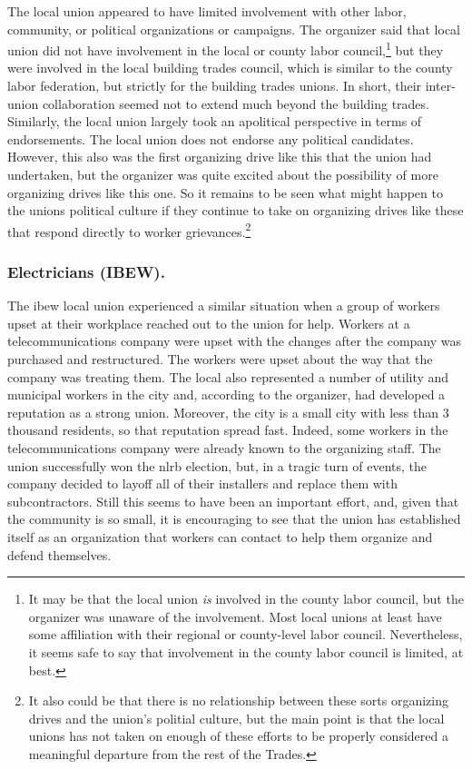 \documentclass[12pt]{article}
\begin{document}
The local union appeared to have limited involvement with other labor, community, or political organizations or campaigns. The organizer said that local union did not have involvement in the local or county labor council,\footnote{It may be that the local union \emph{is} involved in the county labor council, but the organizer was unaware of the involvement. Most local unions at least have some affiliation with their regional or county-level labor council. Nevertheless, it seems safe to say that involvement in the county labor council is limited, at best.} but they were involved in the local building trades council, which is similar to the county labor federation, but strictly for the building trades unions. In short, their inter-union collaboration seemed not to extend much beyond the building trades. Similarly, the local union largely took an apolitical perspective in terms of endorsements. The local union does not endorse any political candidates. However, this also was the first organizing drive like this that the union had undertaken, but the organizer was quite excited about the possibility of more organizing drives like this one. So it remains to be seen what might happen to the unions political culture if they continue to take on organizing drives like these that respond directly to worker grievances.\footnote{It also could be that there is no relationship between these sorts organizing drives and the union's politial culture, but the main point is that the local unions has not taken on enough of these efforts to be properly considered a meaningful departure from the rest of the Trades.}

\subsubsection{Electricians (IBEW).}

The \acrshort{ibew} local union experienced a similar situation when a group of workers upset at their workplace reached out to the union for help. Workers at a telecommunications company were upset with the changes after the company was purchased and restructured. The workers were upset about the way that the company was treating them. The local also represented a number of utility and municipal workers in the city and, according to the organizer, had developed a reputation as a strong union. Moreover, the city is a small city with less than 3 thousand residents, so that reputation spread fast. Indeed, some workers in the telecommunications company were already known to the organizing staff. The union successfully won the \acrshort{nlrb} election, but, in a tragic turn of events, the company decided to layoff all of their installers and replace them with subcontractors. Still this seems to have been an important effort, and, given that the community is so small, it is encouraging to see that the union has established itself as an organization that workers can contact to help them organize and defend themselves.
\end{document}
